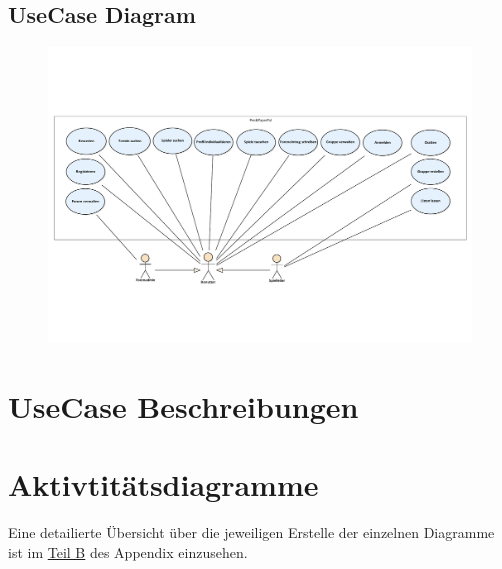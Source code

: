 \documentclass[DIV=13, 10pt,a4paper]{scrartcl}
\begin{document}
\newpage
\begin{landscape}
	\thispagestyle{empty}
	\section{UseCase Diagram}
	\begin{figure}[h!]
		\centering
		\includegraphics[width=\textheight]{docs/1_UseCaseDiagramme/PrimaryUseCases.pdf}
		\label{fig:UCD}
	\end{figure}
	\restoregeometry
\end{landscape}

\newpage
\section{UseCase Beschreibungen}





\pagebreak
\section{Aktivtitätsdiagramme}




\vfill
Eine detailierte Übersicht über die jeweiligen Erstelle der einzelnen Diagramme ist im \hyperref[app:B_DiagrammUebersicht]{Teil B} des Appendix einzusehen.
\end{document}
